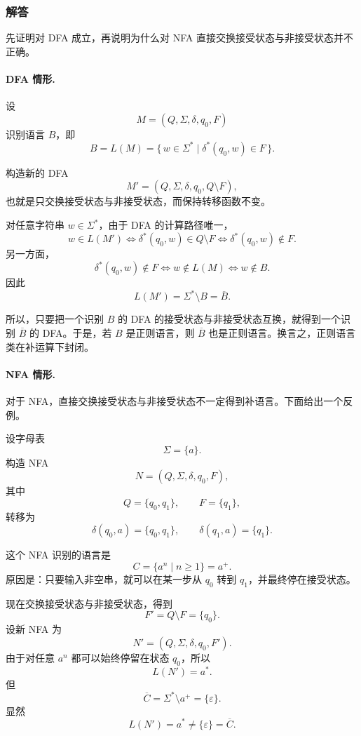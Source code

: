 \begin{answerred}
\subsubsection*{解答}

先证明对 DFA 成立，再说明为什么对 NFA 直接交换接受状态与非接受状态并不正确。

\paragraph{DFA 情形.}
设
\[
    M = (Q, \Sigma, \delta, q_0, F)
\]
识别语言 $B$，即
\[
    B = L(M) = \{\, w \in \Sigma^* \mid \delta^*(q_0, w) \in F \,\}.
\]

构造新的 DFA
\[
    M' = (Q, \Sigma, \delta, q_0, Q \setminus F),
\]
也就是只交换接受状态与非接受状态，而保持转移函数不变。

对任意字符串 $w \in \Sigma^*$，由于 DFA 的计算路径唯一，
\[
    w \in L(M')
    \iff \delta^*(q_0, w) \in Q \setminus F
    \iff \delta^*(q_0, w) \notin F.
\]
另一方面，
\[
    \delta^*(q_0, w) \notin F
    \iff w \notin L(M)
    \iff w \notin B.
\]
因此
\[
    L(M') = \Sigma^* \setminus B = \overline{B}.
\]

所以，只要把一个识别 $B$ 的 DFA 的接受状态与非接受状态互换，就得到一个识别 $\overline{B}$ 的 DFA。于是，若 $B$ 是正则语言，则 $\overline{B}$ 也是正则语言。换言之，正则语言类在补运算下封闭。

\paragraph{NFA 情形.}
对于 NFA，直接交换接受状态与非接受状态不一定得到补语言。下面给出一个反例。

设字母表
\[
    \Sigma = \{a\}.
\]
构造 NFA
\[
    N = (Q, \Sigma, \delta, q_0, F),
\]
其中
\[
    Q = \{q_0, q_1\}, \qquad F = \{q_1\},
\]
转移为
\[
    \delta(q_0, a) = \{q_0, q_1\}, \qquad \delta(q_1, a) = \{q_1\}.
\]

这个 NFA 识别的语言是
\[
    C = \{a^n \mid n \geq 1\} = a^+.
\]
原因是：只要输入非空串，就可以在某一步从 $q_0$ 转到 $q_1$，并最终停在接受状态。

现在交换接受状态与非接受状态，得到
\[
    F' = Q \setminus F = \{q_0\}.
\]
设新 NFA 为
\[
    N' = (Q, \Sigma, \delta, q_0, F').
\]
由于对任意 $a^n$ 都可以始终停留在状态 $q_0$，所以
\[
    L(N') = a^*.
\]
但
\[
    \overline{C}
    = \Sigma^* \setminus a^+
    = \{\varepsilon\}.
\]
显然
\[
    L(N') = a^* \neq \{\varepsilon\} = \overline{C}.
\]


\end{answerred}
